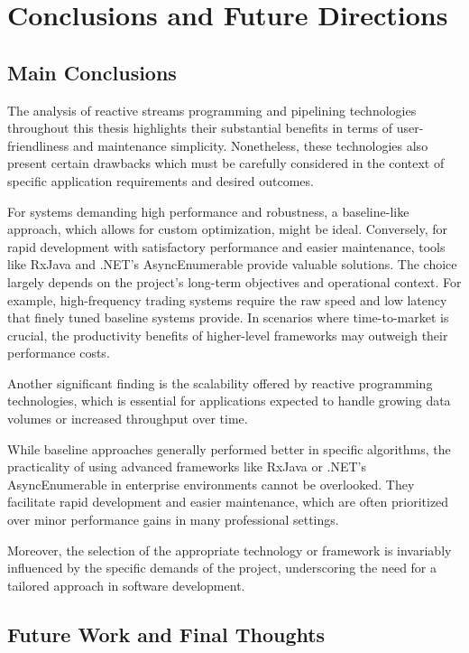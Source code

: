 \chapter{Conclusions and Future Directions}

\section{Main Conclusions}

The analysis of reactive streams programming and pipelining technologies throughout this thesis highlights their substantial benefits in terms of user-friendliness and maintenance simplicity. Nonetheless, these technologies also present certain drawbacks which must be carefully considered in the context of specific application requirements and desired outcomes.

For systems demanding high performance and robustness, a baseline-like approach, which allows for custom optimization, might be ideal. Conversely, for rapid development with satisfactory performance and easier maintenance, tools like RxJava and .NET's AsyncEnumerable provide valuable solutions. The choice largely depends on the project's long-term objectives and operational context. For example, high-frequency trading systems require the raw speed and low latency that finely tuned baseline systems provide. In scenarios where time-to-market is crucial, the productivity benefits of higher-level frameworks may outweigh their performance costs.

Another significant finding is the scalability offered by reactive programming technologies, which is essential for applications expected to handle growing data volumes or increased throughput over time.

While baseline approaches generally performed better in specific algorithms, the practicality of using advanced frameworks like RxJava or .NET's AsyncEnumerable in enterprise environments cannot be overlooked. They facilitate rapid development and easier maintenance, which are often prioritized over minor performance gains in many professional settings.

Moreover, the selection of the appropriate technology or framework is invariably influenced by the specific demands of the project, underscoring the need for a tailored approach in software development.

\section{Future Work and Final Thoughts}

